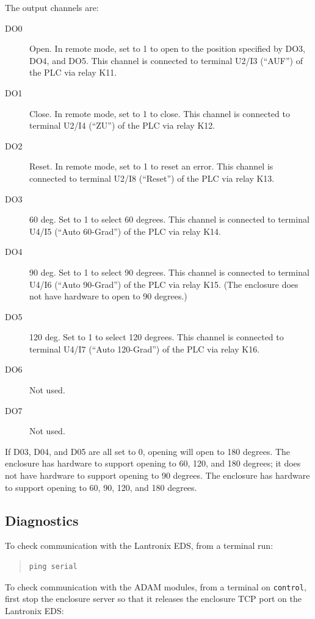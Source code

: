 The output channels are:
\begin{description}
\item[DO0] Open. In remote mode, set to 1 to open to the position specified by DO3, DO4, and DO5. This channel is connected to terminal U2/I3 (“AUF”) of the PLC via relay K11.
\item[DO1] Close. In remote mode, set to 1 to close. This channel is connected to terminal U2/I4 (“ZU”) of the PLC via relay K12.
\item[DO2] Reset. In remote mode, set to 1 to reset an error. This channel is connected to terminal U2/I8 (“Reset”) of the PLC via relay K13.
\item[DO3] 60 deg. Set to 1 to select 60 degrees. This channel is connected to terminal U4/I5 (“Auto 60-Grad”) of the PLC via relay K14.
\item[DO4] 90 deg. Set to 1 to select 90 degrees. This channel is connected to terminal U4/I6 (“Auto 90-Grad”) of the PLC via relay K15. 
\ifcoatli
(The {\projectname} enclosure does not have hardware to open to 90 degrees.)
\fi
\item[DO5] 120 deg. Set to 1 to select 120 degrees. This channel is connected to terminal U4/I7 (“Auto 120-Grad”) of the PLC via relay K16.
\item[DO6] Not used.
\item[DO7] Not used.
\end{description}

If D03, D04, and D05 are all set to 0, opening will open to 180 degrees. 
\ifcoatli
The {\projectname} enclosure has hardware to support opening to 60, 120, and 180 degrees; it does not have hardware to support opening to 90 degrees. 
\fi
\ifddoti
The {\projectname} enclosure has hardware to support opening to 60, 90, 120, and 180 degrees.
\fi

\subsection{Diagnostics}

To check communication with the Lantronix EDS, from a terminal run:

\begin{quotation}
\begin{verbatim}
ping serial
\end{verbatim}
\end{quotation}

To check communication with the ADAM modules, from a terminal on \verb|control|, first stop the enclosure server so that it releases the enclosure TCP port on the Lantronix EDS:

